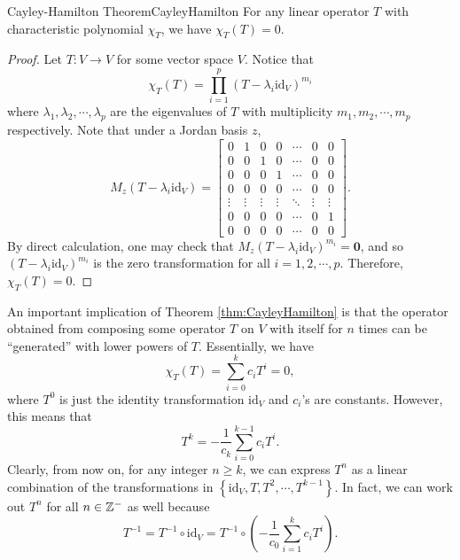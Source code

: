 \documentclass[math, code]{amznotes}
\theoremstyle{remark}
\newcommand{\zero}{\mathbf{0}}
\begin{document}
\begin{thmbox}{Cayley-Hamilton Theorem}{CayleyHamilton}
    For any linear operator $T$ with characteristic polynomial $\chi_T$, we have $\chi_T(T) = 0$.
    \tcblower
    \begin{proof}
        Let $T \colon V \to V$ for some vector space $V$. Notice that 
        \begin{equation*}
            \chi_T(T) = \prod_{i = 1}^{p}(T - \lambda_i\mathrm{id}_V)^{m_i}
        \end{equation*}
        where $\lambda_1, \lambda_2, \cdots, \lambda_p$ are the eigenvalues of $T$ with multiplicity $m_1, m_2, \cdots, m_p$ respectively. Note that under a Jordan basis $z$, 
        \begin{equation*}
            M_z(T - \lambda_i\mathrm{id}_V) = \begin{bmatrix}
                0 & 1 & 0 & 0 & \cdots & 0 & 0 \\
                0 & 0 & 1 & 0 & \cdots & 0 & 0 \\
                0 & 0 & 0 & 1 & \cdots & 0 & 0 \\
                0 & 0 & 0 & 0 & \cdots & 0 & 0 \\
                \vdots & \vdots & \vdots & \vdots & \ddots & \vdots & \vdots \\
                0 & 0 & 0 & 0 & \cdots & 0 & 1 \\
                0 & 0 & 0 & 0 & \cdots & 0 & 0
            \end{bmatrix}.
        \end{equation*}
        By direct calculation, one may check that $M_z(T - \lambda_i\mathrm{id}_V)^{m_i} = \zero$, and so $(T - \lambda_i\mathrm{id}_V)^{m_i}$ is the zero transformation for all $i = 1, 2, \cdots, p$. Therefore, $\chi_T(T) = 0$.
    \end{proof}
\end{thmbox}
An important implication of Theorem \ref{thm:CayleyHamilton} is that the operator obtained from composing some operator $T$ on $V$ with itself for $n$ times can be ``generated'' with lower powers of $T$. Essentially, we have 
\begin{equation*}
    \chi_T(T) = \sum_{i = 0}^{k}c_iT^i = 0,
\end{equation*}
where $T^0$ is just the identity transformation $\mathrm{id}_V$ and $c_i$'s are constants. However, this means that 
\begin{equation*}
    T^k = -\frac{1}{c_k}\sum_{i = 0}^{k - 1}c_iT^i.
\end{equation*}
Clearly, from now on, for any integer $n \geq k$, we can express $T^n$ as a linear combination of the transformations in $\left\{\mathrm{id}_V, T, T^2, \cdots, T^{k - 1}\right\}$. In fact, we can work out $T^n$ for all $n \in \mathbb{Z}^-$ as well because 
\begin{equation*}
    T^{-1} = T^{-1} \circ \mathrm{id}_V = T^{-1} \circ \left(-\frac{1}{c_0}\sum_{i = 1}^{k}c_iT^i\right).
\end{equation*}
\end{document}
